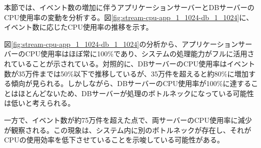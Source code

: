 \documentclass[../../../../../../main]{subfiles}
\begin{document}
    \label{subsubsubsec:result-streaming-only-limit-cpu}

    本節では、イベント数の増加に伴うアプリケーションサーバーとDBサーバーのCPU使用率の変動を分析する。図\ref{fig:stream-cpu-app_1_1024-db_1_1024}に、イベント数に応じたCPU使用率の推移を示す。

    

    図\ref{fig:stream-cpu-app_1_1024-db_1_1024}の分析から、アプリケーションサーバーのCPU使用率はほぼ常に100\%であり、システムの処理能力がフルに活用されていることが示されている。対照的に、DBサーバーのCPU使用率はイベント数が35万件までは50\%以下で推移しているが、35万件を超えると約80\%に増加する傾向が見られる。しかしながら、DBサーバーのCPU使用率が100\%に達することはほとんどないため、DBサーバーが処理のボトルネックになっている可能性は低いと考えられる。

    一方で、イベント数が約75万件を超えた点で、両サーバーのCPU使用率に減少が観察される。この現象は、システム内に別のボトルネックが存在し、それがCPUの使用効率を低下させていることを示唆している可能性がある。
\end{document}

